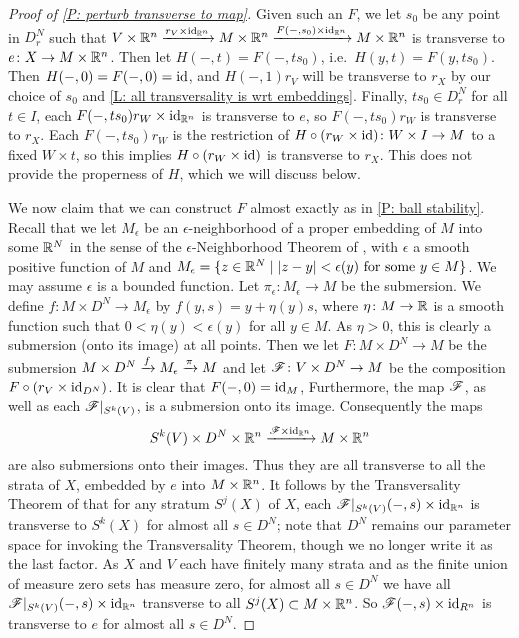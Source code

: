 \begin{proof}[Proof of \cref{P: perturb transverse to map}]
	Given such an $F$, we let $s_0$ be any point in $D_r^N$ such that $V \times \mathbb{R}^n \xrightarrow{r_V \times \mathrm{id}_{\mathbb{R}^n}} M \times \mathbb{R}^n \xrightarrow{F(-,s_0) \times \mathrm{id}_{\mathbb{R}^n}} M \times \mathbb{R}^n$ is transverse to $e \colon X \to M \times \mathbb{R}^n$.
	Then let $H(-,t) = F(-,ts_0)$, i.e.\ $H(y,t) = F(y,ts_0)$.
	Then $H(-,0) = F(-,0) = \mathrm{id}$, and $H(-,1)r_V$ will be transverse to $r_X$ by our choice of $s_0$ and \cref{L: all transversality is wrt embeddings}.
	Finally, $ts_0 \in D_r^N$ for all $t \in I$, each $F(-,ts_0)r_W \times \mathrm{id}_{\mathbb{R}^n}$ is transverse to $e$, so $F(-,ts_0)r_W$ is transverse to $r_X$.
	Each $F(-,ts_0)r_W$ is the restriction of $H \circ (r_W \times \mathrm{id}) \colon W \times I \to M$ to a fixed $W \times t$, so this implies $H \circ (r_W \times \mathrm{id})$ is transverse to $r_X$.
	This does not provide the properness of $H$, which we will discuss below.

	We now claim that we can construct $F$ almost exactly as in \cref{P: ball stability}.
	Recall that we let $M_\epsilon$ be an $\epsilon$-neighborhood of a proper embedding of $M$ into some $\mathbb{R}^N$ in the sense of the $\epsilon$-Neighborhood Theorem of \cite[Section 2.3]{GuPo74}, with $\epsilon$ a smooth positive function of $M$ and $M_\epsilon = \{z \in \mathbb{R}^N \mid |z-y|<\epsilon(y) \text{ for some }y \in M\}$.
	We may assume $\epsilon$ is a bounded function.
	Let $\pi_\epsilon: M_\epsilon \to M$ be the submersion.
	We define $f: M \times D^N \to M_\epsilon$ by $f(y, s) = y + \eta(y) s$, where $\eta \colon M \to \mathbb{R}$ is a smooth function such that $0 < \eta(y) < \epsilon(y)$ for all $y \in M$.
	As $\eta > 0$, this is clearly a submersion (onto its image) at all points.
	Then we let $F \colon M \times D^N \to M$ be the submersion $M \times D^N \xrightarrow{f}M_\epsilon \xrightarrow{\pi} M$ and let $\mathscr{F} \colon V \times D^N \to M$ be the composition $F \circ (r_V \times \mathrm{id}_{D^N})$.
	It is clear that $F(-,0) = \mathrm{id}_M$,
	Furthermore, the map $\mathscr{F}$, as well as each $\mathscr{F}|_{S^k(V)}$, is a submersion onto its image.
	Consequently the maps
	$$S^k(V) \times D^N \times \mathbb{R}^n \xrightarrow{\mathscr{F} \times \mathrm{id}_{\mathbb{R}^n}} M \times \mathbb{R}^n$$
	are also submersions onto their images.
	Thus they are all transverse to all the strata of $X$, embedded by $e$ into $M \times \mathbb{R}^n$.
	It follows by the Transversality Theorem of \cite[Section 2.3]{GuPo74} that for any stratum $S^j(X)$ of $X$, each $\mathscr{F}|_{S^k(V)}(-,s) \times \mathrm{id}_{\mathbb{R}^n}$ is transverse to $S^k(X)$ for almost all $s \in D^N$; note that $D^N$ remains our parameter space for invoking the Transversality Theorem, though we no longer write it as the last factor.
	As $X$ and $V$ each have finitely many strata and as the finite union of measure zero sets has measure zero, for almost all $s \in D^N$ we have all $\mathscr{F}|_{S^k(V)}(-,s) \times \mathrm{id}_{\mathbb{R}^n}$ transverse to all $S^j(X) \subset M \times \mathbb{R}^n$.
	So $\mathscr{F}(-,s) \times \mathrm{id}_{R^n}$ is transverse to $e$ for almost all $s \in D^N$.


\end{proof}
